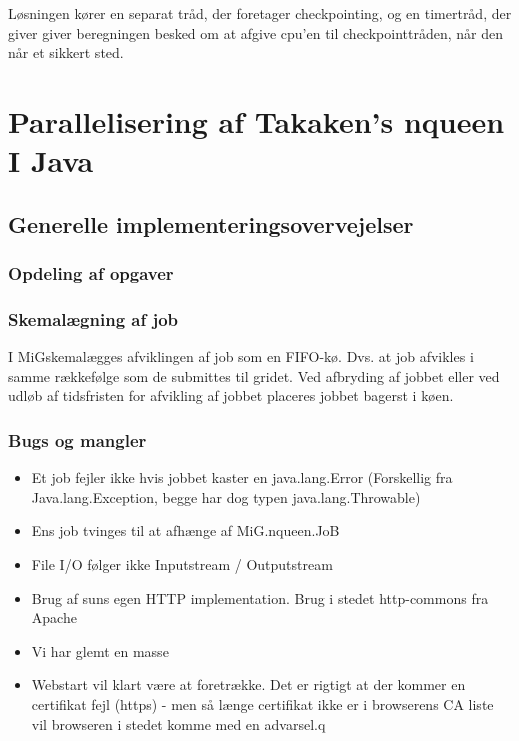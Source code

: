 \documentclass[pdf,draft,a4paper,11pt]{article}
\newcommand{\mig}{MiG}
\begin{document}
Løsningen kører en separat tråd, der foretager checkpointing, og en timertråd, der giver giver beregningen besked om at afgive cpu'en til checkpointtråden, når den når et sikkert sted.

\section{Parallelisering af Takaken's nqueen I Java}

\subsection{Generelle implementeringsovervejelser}
\subsubsection{Opdeling af opgaver}


\subsubsection{Skemalægning af job}
I \mig skemalægges afviklingen af job som en FIFO-kø. Dvs. at job afvikles i samme rækkefølge som de submittes til gridet. Ved afbryding af jobbet eller ved udløb af tidsfristen for afvikling af jobbet placeres jobbet bagerst i køen.  




\subsubsection{Bugs og mangler}\label{bugs}
\begin{itemize}
	\item Et job fejler ikke hvis jobbet kaster en java.lang.Error (Forskellig fra Java.lang.Exception, begge har dog typen java.lang.Throwable)
	\item Ens job tvinges til at afhænge af MiG.nqueen.JoB
	\item File I/O følger ikke Inputstream / Outputstream	
	\item Brug af suns egen HTTP implementation. Brug i stedet http-commons fra Apache
	\item Vi har glemt en masse 
	\item Webstart vil klart være at foretrække. Det er rigtigt at der kommer en certifikat fejl (https) - men så længe certifikat ikke er i browserens CA liste vil browseren i stedet komme med en advarsel.q
\end{itemize}
\end{document}
